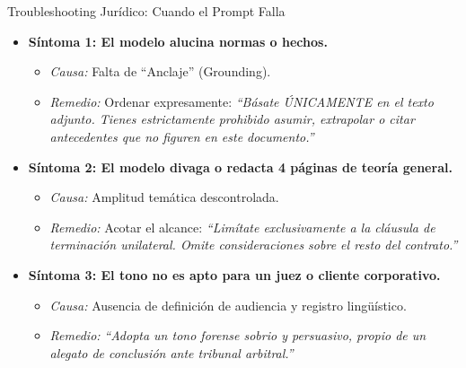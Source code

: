 \documentclass[aspectratio=169]{beamer}
\begin{document}
\begin{frame}{Troubleshooting Jurídico: Cuando el Prompt Falla}

\begin{itemize}
  \item \textbf{Síntoma 1: El modelo alucina normas o hechos.}
  \begin{itemize}
    \item \textit{Causa:} Falta de ``Anclaje'' (Grounding).
    \item \textit{Remedio:} Ordenar expresamente: \textit{``Básate ÚNICAMENTE en el texto adjunto. Tienes estrictamente prohibido asumir, extrapolar o citar antecedentes que no figuren en este documento.''}
  \end{itemize}
  \item \textbf{Síntoma 2: El modelo divaga o redacta 4 páginas de teoría general.}
  \begin{itemize}
    \item \textit{Causa:} Amplitud temática descontrolada.
    \item \textit{Remedio:} Acotar el alcance: \textit{``Limítate exclusivamente a la cláusula de terminación unilateral. Omite consideraciones sobre el resto del contrato.''}
  \end{itemize}
  \item \textbf{Síntoma 3: El tono no es apto para un juez o cliente corporativo.}
  \begin{itemize}
    \item \textit{Causa:} Ausencia de definición de audiencia y registro lingüístico.
    \item \textit{Remedio:} \textit{``Adopta un tono forense sobrio y persuasivo, propio de un alegato de conclusión ante tribunal arbitral.''}
  \end{itemize}
\end{itemize}
\end{frame}
\end{document}

